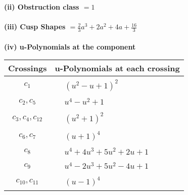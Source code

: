 \documentclass[1p]{elsarticle_modified}
\theoremstyle{definition}
\begin{document}
\flushleft \textbf{(ii) Obstruction class $= 1$}\\~\\
\flushleft \textbf{(iii) Cusp Shapes $= \frac{2}{3} a^3+2 a^2+4 a+\frac{16}{3}$}\\~\\
\newpage\renewcommand{\arraystretch}{1}
\flushleft \textbf{(iv) u-Polynomials at the component}\newline \\
\begin{tabular}{m{50pt}|m{274pt}}
Crossings & \hspace{64pt}u-Polynomials at each crossing \\
\hline $$\begin{aligned}c_{1}\end{aligned}$$&$\begin{aligned}
&(u^2- u+1)^2
\end{aligned}$\\
\hline $$\begin{aligned}c_{2},c_{5}\end{aligned}$$&$\begin{aligned}
&u^4- u^2+1
\end{aligned}$\\
\hline $$\begin{aligned}c_{3},c_{4},c_{12}\end{aligned}$$&$\begin{aligned}
&(u^2+1)^2
\end{aligned}$\\
\hline $$\begin{aligned}c_{6},c_{7}\end{aligned}$$&$\begin{aligned}
&(u+1)^4
\end{aligned}$\\
\hline $$\begin{aligned}c_{8}\end{aligned}$$&$\begin{aligned}
&u^4+4 u^3+5 u^2+2 u+1
\end{aligned}$\\
\hline $$\begin{aligned}c_{9}\end{aligned}$$&$\begin{aligned}
&u^4-2 u^3+5 u^2-4 u+1
\end{aligned}$\\
\hline $$\begin{aligned}c_{10},c_{11}\end{aligned}$$&$\begin{aligned}
&(u-1)^4
\end{aligned}$\\
\hline
\end{tabular}\\~\\
\end{document}

